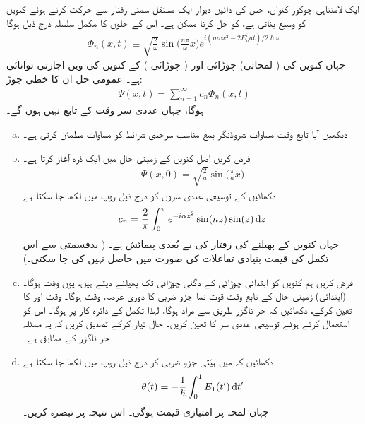 ایک لامتناہی چوکور کنواں، جس کی دائیں دیوار ایک مستقل سمتی رفتار  سے حرکت کرتے ہوئے کنویں کو وسیع بناتی ہے، کو  حل کرنا ممکن ہے۔ اس کے حلوں کا مکمل سلسلہ درج ذیل ہوگا 
\begin{align}\label{مساوات_حر_مکمل_حل_چوکور_کنواں}
\Phi_n (x, t) \equiv \sqrt{\frac{2}{\omega}} \sin \big ( \frac{n \pi}{\omega} x \big ) e^{i(mvx^2 -2E_n^i at)/2\hslash \omega}
\end{align}
جہاں  کنویں کی ( لمحاتی) چوڑائی اور  ( چوڑائی ) کے  کنویں کی  ویں اجازتی توانائی ہے۔ عمومی حل ان  کا خطی جوڑ:
\begin{align}
\Psi (x, t) = \sum_{n = 1}^{\infty} c_n \Phi_n (x, t)
\end{align}
ہوگا، جہاں عددی سر  وقت  کے تابع نہیں ہوں گے۔
\begin{enumerate}[a.]
\item
دیکھیں آیا تابع وقت مساوات شروڈنگر بمع مناسب سرحدی شرائط کو مساوات  مطمئن کرتی ہے۔
\item
فرض کریں اصل کنویں کے زمینی حال میں ایک ذرہ آغاز  کرتا ہے۔
\begin{align*}
\Psi (x, 0) = \sqrt{\frac{2}{a}} \sin \big ( \frac{\pi}{a} x \big )
\end{align*}
دکھائیں کے توسیعی عددی سروں کو درج ذیل روپ میں لکھا جا سکتا ہے 
\begin{align}
c_n = \frac{2}{\pi} \int_0^{\pi} e^{-i\alpha z^2} \sin(nz) \sin(z) \dif z
\end{align}
جہاں  کنویں کے پھیلنے کی رفتار کی بے بُعدی پیمائش ہے۔ ( بدقسمتی سے اس تکمل کی قیمت بنیادی تفاعلات کی صورت میں حاصل نہیں کی جا سکتی۔) 
\item
فرض کریں ہم کنویں کو ابتدائی چوڑائی کے دگنی چوڑائی تک پھیلنے دیتے ہیں، یوں  وقت  ہوگا۔ (ابتدائی) زمینی حال کے تابع وقت قوت نما جزو ضربی کا دوری عرصہ،  وقت ہوگا۔ وقت  اور  کا تعین کرکے، دکھائیں کہ حر ناگزر طریق سے مراد  ہوگا، لہٰذا تکمل کے
 دائرہ کار پر  ہوگا۔ اس کو استعمال کرتے ہوئے توسیعی عددی سر  کا تعین کریں۔ حال  تیار کرکے تصدیق کریں کہ یہ مسئلہ حر ناگزر کے مطابق ہے۔
\item
دکھائیں کہ  میں ہیّتی جزو ضربی کو درج ذیل روپ میں لکھا جا سکتا ہے 
\begin{align}
\theta (t) = - \frac{1}{\hslash} \int_0^1 E_1 (t') \dif t'
\end{align}
جہاں لمحہ  پر  امتیازی قیمت  ہوگی۔ اس نتیجہ پر تبصرہ کریں۔
\end{enumerate}

